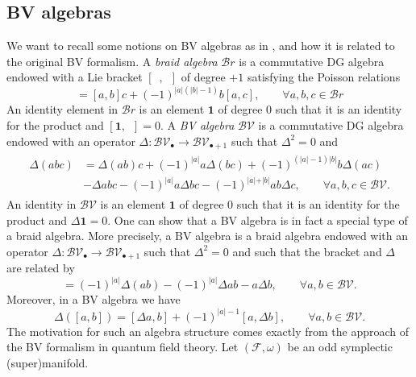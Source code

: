 \documentclass[11pt,colorinlistoftodos]{amsart}
\numberwithin{equation}{subsection}
\theoremstyle{plain}
\theoremstyle{definition}
\theoremstyle{remark}
\newcommand{\calF}{\mathcal{F}}
\begin{document}
\subsection{BV algebras}
\label{subsec:BV_algebras}
We want to recall some notions on BV algebras as in \cite{Getzler1994}, and how it is related to the original BV formalism. A \emph{braid algebra} $\mathcal{B}r$ is a commutative DG algebra endowed with a Lie bracket $[\enspace,\enspace]$ of degree $+1$ satisfying the Poisson relations
\begin{equation}
    [a,bc]=[a,b]c+(-1)^{\vert a\vert(\vert b\vert -1)}b[a,c],\qquad \forall a,b,c\in \mathcal{B}r
\end{equation}
An identity element in $\mathcal{B}r$ is an element $\boldsymbol{1}$ of degree 0 such that it is an identity for the product and $[\boldsymbol{1},\enspace]=0$.
A \emph{BV algebra} $\mathcal{BV}$ is a commutative DG algebra endowed with an operator $\Delta\colon \mathcal{BV}_\bullet\to \mathcal{BV}_{\bullet+1}$ such that $\Delta^2=0$ and 
\begin{align}
\label{app:eq:BV_Laplacian_2}
\begin{split}
    \Delta(abc)&=\Delta(ab)c+(-1)^{\vert a\vert}a\Delta(bc)+(-1)^{(\vert a\vert-1)\vert b\vert}b\Delta(ac)\\
    &-\Delta abc-(-1)^{\vert a\vert}a\Delta bc-(-1)^{\vert a\vert+\vert b\vert}ab\Delta c,\qquad \forall a,b,c\in \mathcal{BV}.
\end{split}
\end{align}
An identity in $\mathcal{BV}$ is an element $\boldsymbol{1}$ of degree 0 such that it is an identity for the product and $\Delta\boldsymbol{1}=0$. One can show that a BV algebra is in fact a special type of a braid algebra. More precisely, a BV algebra is a braid algebra endowed with an operator $\Delta\colon \mathcal{BV}_\bullet\to \mathcal{BV}_{\bullet+1}$ such that $\Delta^2=0$ and such that the bracket and $\Delta$ are related by
\begin{equation}
    [a,b]=(-1)^{\vert a\vert}\Delta(ab)-(-1)^{\vert a\vert}\Delta ab-a\Delta b,\qquad\forall a,b\in \mathcal{BV}.
\end{equation}
Moreover, in a BV algebra we have 
\begin{equation}
    \Delta([a,b])=[\Delta a,b]+(-1)^{\vert a\vert-1}[a,\Delta b],\qquad \forall a,b\in \mathcal{BV}.
\end{equation}
The motivation for such an algebra structure comes exactly from the approach of the BV formalism in quantum field theory. Let $(\calF,\omega)$ be an odd symplectic (super)manifold.
\end{document}
